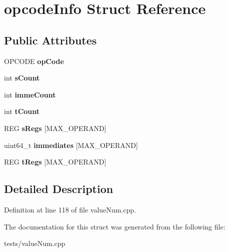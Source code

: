 \hypertarget{structopcodeInfo}{\section{opcode\-Info Struct Reference}
\label{structopcodeInfo}
}
\subsection*{Public Attributes}
\begin{DoxyCompactItemize}
\item 
\hypertarget{structopcodeInfo_a15b75597f0df1399c5bad411884d37fa}{O\-P\-C\-O\-D\-E {\bfseries op\-Code}}\label{structopcodeInfo_a15b75597f0df1399c5bad411884d37fa}

\item 
\hypertarget{structopcodeInfo_ad9051257b475a9bf53b45d6a1d1fec08}{int {\bfseries s\-Count}}\label{structopcodeInfo_ad9051257b475a9bf53b45d6a1d1fec08}

\item 
\hypertarget{structopcodeInfo_a8933b75d43809b8220ff3fde3173c945}{int {\bfseries imme\-Count}}\label{structopcodeInfo_a8933b75d43809b8220ff3fde3173c945}

\item 
\hypertarget{structopcodeInfo_afe7b6c29cf0f466ac709eb577ffd40fc}{int {\bfseries t\-Count}}\label{structopcodeInfo_afe7b6c29cf0f466ac709eb577ffd40fc}

\item 
\hypertarget{structopcodeInfo_aee035923812e175d8d633ffe8b84fd50}{R\-E\-G {\bfseries s\-Regs} \mbox{[}M\-A\-X\-\_\-\-O\-P\-E\-R\-A\-N\-D\mbox{]}}\label{structopcodeInfo_aee035923812e175d8d633ffe8b84fd50}

\item 
\hypertarget{structopcodeInfo_ae41b20eb8d58bc58fe05cf2679d54b52}{uint64\-\_\-t {\bfseries immediates} \mbox{[}M\-A\-X\-\_\-\-O\-P\-E\-R\-A\-N\-D\mbox{]}}\label{structopcodeInfo_ae41b20eb8d58bc58fe05cf2679d54b52}

\item 
\hypertarget{structopcodeInfo_ad6bb3712a8b714ee2898aca4488c1b89}{R\-E\-G {\bfseries t\-Regs} \mbox{[}M\-A\-X\-\_\-\-O\-P\-E\-R\-A\-N\-D\mbox{]}}\label{structopcodeInfo_ad6bb3712a8b714ee2898aca4488c1b89}

\end{DoxyCompactItemize}


\subsection{Detailed Description}


Definition at line 118 of file value\-Num.\-cpp.



The documentation for this struct was generated from the following file\-:\begin{DoxyCompactItemize}
\item 
tests/value\-Num.\-cpp\end{DoxyCompactItemize}

